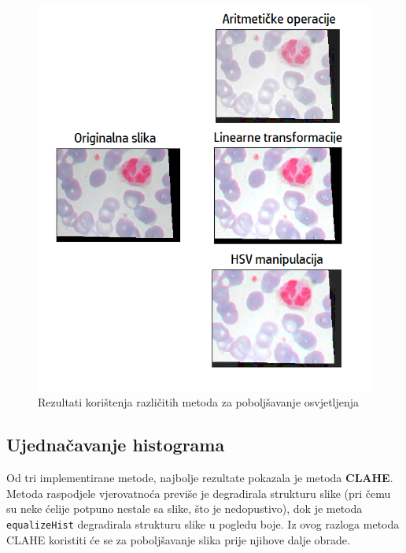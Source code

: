 \documentclass[12pt,a4paper]{article}
\begin{document}
\begin{figure}[H]

\center
\includegraphics[scale=0.9]{slikaOsvjetljenje.png}
\caption{Rezultati korištenja različitih metoda za poboljšavanje osvjetljenja}
	
\end{figure}

\newpage

\subsection{Ujednačavanje histograma}

Od tri implementirane metode, najbolje rezultate pokazala je metoda \textbf{CLAHE}. Metoda raspodjele vjerovatnoća previše je degradirala strukturu slike (pri čemu su neke ćelije potpuno nestale sa slike, što je nedopustivo), dok je metoda \texttt{equalizeHist} degradirala strukturu slike u pogledu boje. Iz ovog razloga metoda CLAHE koristiti će se za poboljšavanje slika prije njihove dalje obrade.
\end{document}

